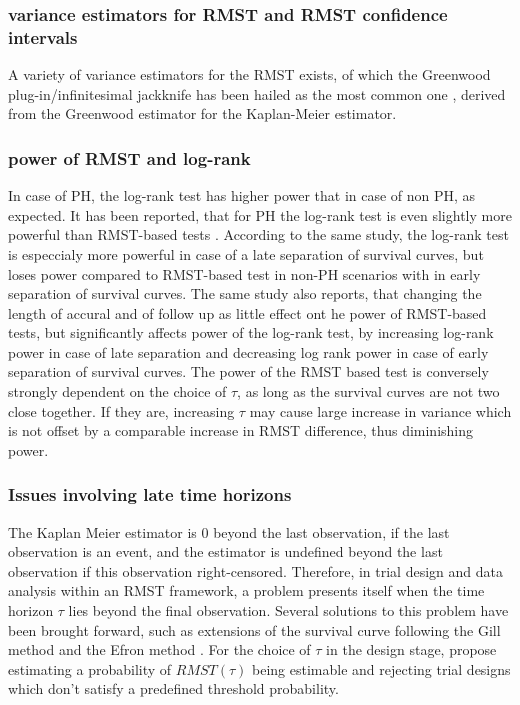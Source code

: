 \documentclass[main.tex]{subfiles}
\begin{document}
\subsubsection{variance estimators for RMST and RMST confidence intervals}

A variety of variance estimators for the RMST exists, of which the Greenwood plug-in/infinitesimal jackknife has been hailed as the most common one \parencite{Eaton2020-xo}, derived from the Greenwood estimator for the Kaplan-Meier estimator.

\subsubsection{power of RMST and log-rank}
In case of PH, the log-rank test has higher power that in case of non PH, as expected. It has been reported, that for PH the log-rank test is even slightly more powerful than RMST-based tests \parencite{eaton}. According to the same study, the log-rank test is especcialy more powerful in case of a late separation of survival curves, but loses power compared to RMST-based test in non-PH scenarios with in early separation of survival curves. The same study also reports, that changing the length of accural and of follow up as little effect ont he power of RMST-based tests, but significantly affects power of the log-rank test, by increasing log-rank power in case of late separation and decreasing log rank power in case of early separation of survival curves. The power of the RMST based test is conversely strongly dependent on the choice of $\tau$, as long as the survival curves are not two close together. If they are, increasing $\tau$ may cause large increase in variance which is not offset by a comparable increase in RMST difference, thus diminishing power.

\subsubsection{Issues involving late time horizons}

The Kaplan Meier estimator is $0$ beyond the last observation, if the last observation is an event, and the estimator is undefined beyond the last observation if this observation right-censored.
Therefore, in trial design and data analysis within an RMST framework, a problem presents itself when the time horizon $\tau$ lies beyond the final observation. Several solutions to this problem have been brought forward, such as extensions of the survival curve following the Gill method and the Efron method \parencite{Eaton2020-xo}. For the choice of $\tau$ in the design stage, \textcite{Eaton2020-xo} propose estimating a probability of $RMST(\tau)$ being estimable and rejecting trial designs which don't satisfy a predefined threshold probability.
\end{document}
